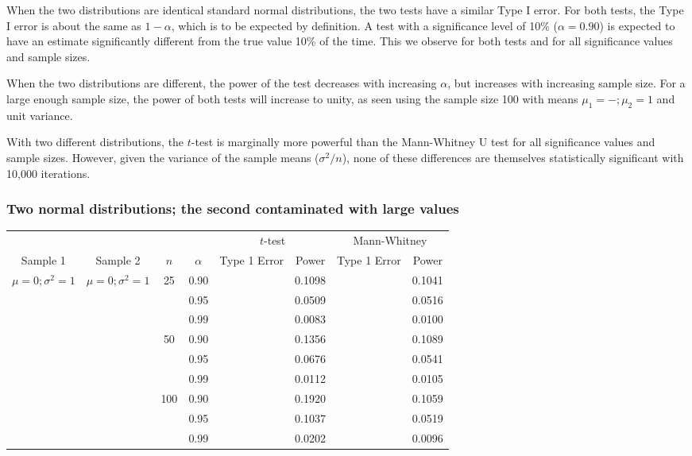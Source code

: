 \documentclass{article}
\begin{document}
When the two distributions are identical standard normal distributions, the two tests have a similar Type I error. For both tests, the Type I error is about the same as $1-\alpha$, which is to be expected by definition. A test with a significance level of 10\% ($\alpha = 0.90$) is expected to have an estimate significantly different from the true value 10\% of the time. This we observe for both tests and for all significance values and sample sizes. 

When the two distributions are different, the power of the test decreases with increasing $\alpha$, but increases with increasing sample size. For a large enough sample size, the power of both tests will increase to unity, as seen using the sample size 100 with means $\mu_1=-; \mu_2 = 1$ and unit variance.

With two different distributions, the $t$-test is marginally more powerful than the Mann-Whitney U test for all significance values and sample sizes. However, given the variance of the sample means ($\sigma^2/n$), none of these differences are themselves statistically significant with 10,000 iterations. 

\subsubsection*{Two normal distributions; the second contaminated with large values}
\begin{center}
\begin{tabular}{ c c c c c c c c}
\hline
&&&&\multicolumn{2}{c}{$t$-test}&\multicolumn{2}{c}{Mann-Whitney}\\
Sample 1&Sample 2&$n$&$\alpha$&Type 1 Error&Power&Type 1 Error&Power\\
\hline
$\mu = 0; \sigma^2 = 1$&$\mu = 0; \sigma^2 = 1$&25&0.90&&0.1098&&0.1041\\
&&&0.95&&0.0509&&0.0516\\
&&&0.99&&0.0083&&0.0100\\
&&50&0.90&&0.1356&&0.1089\\
&&&0.95&&0.0676&&0.0541\\
&&&0.99&&0.0112&&0.0105\\
&&100&0.90&&0.1920&&0.1059\\
&&&0.95&&0.1037&&0.0519\\
&&&0.99&&0.0202&&0.0096\\
\end{tabular}
\end{center}
\end{document}
